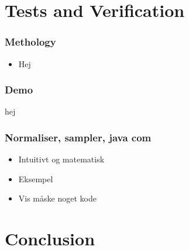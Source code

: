 \section{Tests and Verification}
\begin{frame}
	\frametitle{Methology}
	\begin{itemize}
		\item Hej
	\end{itemize}
\end{frame}

\begin{frame}
	\frametitle{Demo}
  hej
\end{frame}

\begin{frame}
	\frametitle{Normaliser, sampler, java com}
	\begin{itemize}
		\item Intuitivt og matematisk
		\item Eksempel
		\item Vis måske noget kode
	\end{itemize}
\end{frame}

\section{Conclusion}